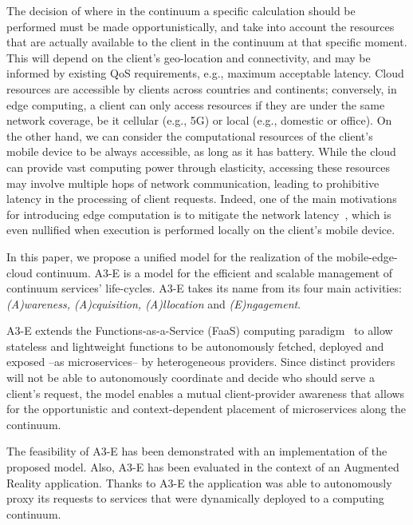 The decision of where in the continuum a specific calculation should be performed must be made opportunistically, and take into account the resources that are actually available to the client in the continuum at that specific moment. This will depend on the client's geo-location and connectivity, and may be informed by existing QoS requirements, e.g., maximum acceptable latency. Cloud resources are accessible by clients across countries and continents; conversely, in edge computing, a client can only access resources if they are under the same network coverage, be it cellular (e.g., 5G) or local (e.g., domestic or office). On the other hand, we can consider the computational resources of the client's mobile device to be always accessible, as long as it has battery. While the cloud can provide vast computing power through elasticity, accessing these resources may involve multiple hops of network communication, leading to prohibitive latency in the processing of client requests. Indeed, one of the main motivations for introducing edge computation is to mitigate the network latency~\cite{Shi:2016}, which is even nullified when execution is performed locally on the client's mobile device.

In this paper, we propose a unified model for the realization of the mobile-edge-cloud continuum. A3-E is a model for the efficient and scalable management of continuum services' life-cycles. A3-E takes its name from its four main activities: \textit{(A)wareness, (A)cquisition, (A)llocation} and \textit{(E)ngagement}. 


A3-E extends the Functions-as-a-Service (FaaS) computing paradigm~\cite{Hendrickson:2016,baldini2017serverless,GarrigaMendonca2017} to allow stateless and lightweight functions to be autonomously fetched, deployed and exposed --as microservices-- by heterogeneous providers. Since distinct providers will not be able to autonomously coordinate and decide who should serve a client's request, the model enables a mutual client-provider awareness that allows for the opportunistic and context-dependent placement of microservices along the continuum. 


The feasibility of A3-E has been demonstrated with an implementation of the proposed model. Also, A3-E has been evaluated in the context of an Augmented Reality application. Thanks to A3-E the application was able to autonomously proxy its requests to services that were dynamically deployed to a computing continuum. 


